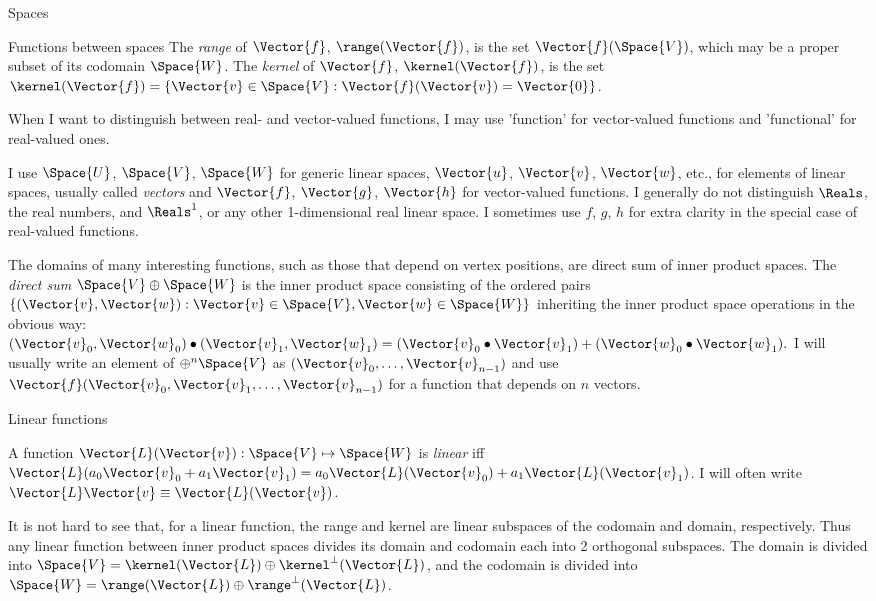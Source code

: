 \begin{plSection}{Spaces}
\begin{plSection}{Functions between spaces}
The \textit{range} of $\Vector{f}$, $\range(\Vector{f})$, is the set $\Vector{f}(\Space{V})$,
which may be a proper subset of its codomain $\Space{W}$.
The \textit{kernel} of $\Vector{f}$, $\kernel(\Vector{f})$, is the set
$\kernel(\Vector{f}) = \left\{ \Vector{v} \in \Space{V} : \Vector{f}(\Vector{v}) = \Vector{0} \right\}$.

When I want to distinguish between real- and vector-valued functions,
I may use 'function' for vector-valued functions and
'functional' for real-valued ones.

I use $\Space{U}$, $\Space{V}$, $\Space{W}$ for generic linear spaces,
$\Vector{u}$, $\Vector{v}$, $\Vector{w}$, etc., for elements of linear spaces,
usually called \textit{vectors}
and
$\Vector{f}$, $\Vector{g}$, $\Vector{h}$ for vector-valued functions.
I generally do not distinguish $\Reals$, the real numbers,
and $\Reals^1$, or any other 1-dimensional real linear space.
I sometimes use $f$, $g$, $h$ for extra clarity in the special
case of real-valued functions.

The domains of many interesting functions,
such as those that depend on vertex positions,
are direct sum of inner product spaces.
The \textit{direct sum} $\Space{V} \oplus \Space{W}$ is the inner product space
consisting of the ordered pairs $\left\{ (\Vector{v},\Vector{w}) : \Vector{v} \in \Space{V}, \Vector{w} \in \Space{W} \right\}$
inheriting the inner product space operations in the obvious way:
$(\Vector{v}_0,\Vector{w}_0) \bullet (\Vector{v}_1,\Vector{w}_1) = (\Vector{v}_0 \bullet \Vector{v}_1) + (\Vector{w}_0 \bullet \Vector{w}_1).$
I will usually write an element of $\oplus^n \Space{V}$ as
$(\Vector{v}_0,\ldots,\Vector{v}_{n-1})$
and use
$\Vector{f}(\Vector{v}_0,\Vector{v}_1,\ldots,\Vector{v}_{n-1})$
for a function that depends on $n$ vectors.

\begin{plSection}{Linear functions}
\label{sec:linear-functions}

A function $\Vector{L}(\Vector{v}):\Space{V} \mapsto \Space{W}$
is \textit{linear} iff
$\Vector{L}(a_0 \Vector{v}_0 + a_1 \Vector{v}_1) = a_0 \Vector{L}(\Vector{v}_0) + a_1 \Vector{L}(\Vector{v}_1)$.
I will often write $\Vector{L}\Vector{v} \equiv \Vector{L}(\Vector{v})$.

It is not hard to see that, for a linear function,
the range and kernel are linear subspaces of the codomain and
domain, respectively.
Thus any linear function between inner product spaces
divides its domain and codomain each into 2 orthogonal subspaces.
The domain is divided into $\Space{V} = \kernel(\Vector{L}) \oplus \kernel^{\perp}(\Vector{L})$,
and the codomain is divided into $\Space{W} = \range(\Vector{L}) \oplus \range^{\perp}(\Vector{L})$.


\end{plSection}
\end{plSection}
\end{plSection}
